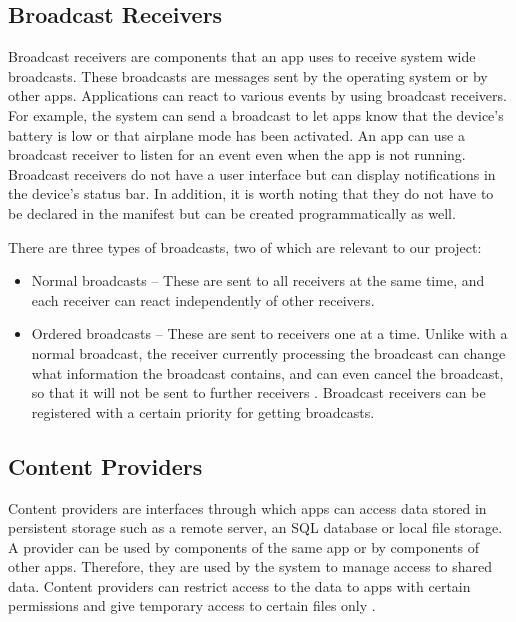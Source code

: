     \subsection{Broadcast Receivers}
        \label{subsec:receivers}
        
    Broadcast receivers are components that an app uses to receive system wide broadcasts. These broadcasts are messages sent by the operating system or by other apps. Applications can react to various events by using broadcast receivers. For example, the system can send a broadcast to let apps know that the device’s battery is low or that airplane mode has been activated. An app can use a broadcast receiver to listen for an event even when the app is not running. Broadcast receivers do not have a user interface but can display notifications in the device’s status bar. In addition, it is worth noting that they do not have to be declared in the manifest but can be created programmatically as well.
    
    There are three types of broadcasts, two of which are relevant to our project:
    \begin{itemize}
        \item Normal broadcasts – These are sent to all receivers at the same time, and each receiver can react independently of other receivers.
        \item Ordered broadcasts – These are sent to receivers one at a time. Unlike with a normal broadcast, the receiver currently processing the broadcast can change what information the broadcast contains, and can even cancel the broadcast, so that it will not be sent to further receivers \cite{broadcasts_overview}. Broadcast receivers can be registered with a certain priority for getting broadcasts.
    \end{itemize}
    
    \subsection{Content Providers}
        \label{subsec:content_providers}
        
    Content providers are interfaces through which apps can access data stored in persistent storage such as a remote server, an SQL database or local file storage. A provider can be used by components of the same app or by components of other apps. Therefore, they are used by the system to manage access to shared data. Content providers can restrict access to the data to apps with certain permissions and give temporary access to certain files only \cite{android_app_fundamentals}.
    
